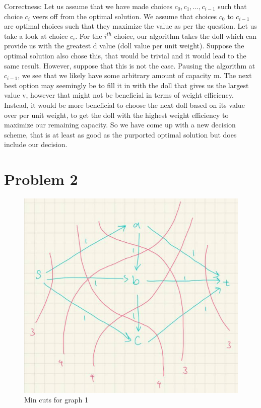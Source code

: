 \documentclass[12pt,letterpaper]{article}
\begin{document}
Correctness: 
Let us assume that we have made choices $c_{0}, c_{1}, ..., c_{i - 1}$
such that choice $c_{i}$ veers off from the optimal solution.
We assume that choices $c_{0}$ to $c_{i - 1}$ are optimal choices such that they maximize the value as per the question.
Let us take a look at choice $c_{i}$.
For the $i^{th}$ choice, our algorithm takes the doll which can provide us
with the greatest d value (doll value per unit weight).
Suppose the optimal solution also chose this, 
that would be trivial and it would lead to the same result.
However, suppose that this is not the case.
Pausing the algorithm at $c_{i - 1}$, we see that we likely have some arbitrary amount of capacity m.
The next best option may seemingly be to fill it in with the doll that gives us the largest value v,
however that might not be beneficial in terms of weight efficiency.
Instead, it would be more beneficial to choose the next doll based on its value over per unit weight,
to get the doll with the highest weight efficiency to maximize our remaining capacity.
So we have come up with a new decision scheme, that is at least as good as the 
purported optimal solution but does include our decision.

\newpage

\section*{Problem 2}

\begin{figure}[!h]
  \centering
  \includegraphics[width=0.9\linewidth]{q2.1.jpg}
  \caption{Min cuts for graph 1}
  \end{figure}
\end{document}
